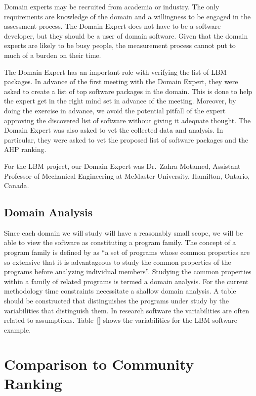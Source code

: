 \documentclass[runningheads]{llncs}
\begin{document}
Domain experts may be recruited from academia or industry.  The only
requirements are knowledge of the domain and a willingness to be engaged in the
assessment process.  The Domain Expert does not have to be a software developer,
but they should be a user of domain software.  Given that the domain experts are
likely to be busy people, the measurement process cannot put to much of a burden
on their time.

The Domain Expert has an important role with verifying the list of LBM packages.
In advance of the first meeting with the Domain Expert, they were asked to
create a list of top software packages in the domain.  This is done to help the
expert get in the right mind set in advance of the meeting.  Moreover, by doing
the exercise in advance, we avoid the potential pitfall of the expert approving
the discovered list of software without giving it adequate thought.  The Domain
Expert was also asked to vet the collected data and analysis.  In particular,
they were asked to vet the proposed list of software packages and the AHP
ranking.

For the LBM project, our Domain Expert was Dr.\
Zahra Motamed, Assistant Professor of Mechanical Engineering at McMaster
University, Hamilton, Ontario, Canada.  

\subsection{Domain Analysis} \label{SecDomainAnalysis}

Since each domain we will study will have a reasonably small scope, we will be
able to view the software as constituting a program family.  The concept of a
program family is defined by \cite{parnas1976design} as ``a set of programs
whose common properties are so extensive that it is advantageous to study the
common properties of the programs before analyzing individual members''.
Studying the common properties within a family of related programs is termed a
domain analysis.  For the current methodology time constraints necessitate a shallow domain analysis.  A table should be constructed that distinguishes the programs under study by the variabilities that distinguish them.  In research software the variabilities are often related to assumptions.  Table~\ref{} shows the variabilities for the LBM software example.

\section{Comparison to Community Ranking} \label{repmetrics}
\end{document}
